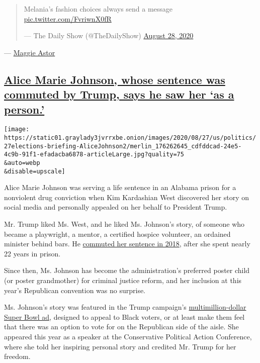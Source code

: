 \begin{quote}
Melania's fashion choices always send a message
\href{https://t.co/FvriwnX0fR}{pic.twitter.com/FvriwnX0fR}

--- The Daily Show (@TheDailyShow)
\href{https://twitter.com/TheDailyShow/status/1299177915028996096?ref_src=twsrc\%5Etfw}{August
28, 2020}
\end{quote}

--- \href{https://www.nytimes3xbfgragh.onion/by/maggie-astor}{Maggie
Astor}

\hypertarget{alice-marie-johnson-whose-sentence-was-commuted-by-trump-says-he-saw-her-as-a-person}{%
\subsection{\texorpdfstring{\protect\hyperlink{alice-marie-johnson-whose-sentence-was-commuted-by-trump-says-he-saw-her-as-a-person}{Alice
Marie Johnson, whose sentence was commuted by Trump, says he saw her `as
a
person.'}}{Alice Marie Johnson, whose sentence was commuted by Trump, says he saw her `as a person.'}}\label{alice-marie-johnson-whose-sentence-was-commuted-by-trump-says-he-saw-her-as-a-person}}

\texttt{[image: https://static01.graylady3jvrrxbe.onion/images/2020/08/27/us/politics/27elections-briefing-AliceJohnson2/merlin\_176262645\_cdfddcad-24e5-4c9b-91f1-efadacba6878-articleLarge.jpg?quality=75\\\&auto=webp\\\&disable=upscale]}

Alice Marie Johnson was serving a life sentence in an Alabama prison for
a nonviolent drug conviction when Kim Kardashian West discovered her
story on social media and personally appealed on her behalf to President
Trump.

Mr. Trump liked Ms. West, and he liked Ms. Johnson's story, of someone
who became a playwright, a mentor, a certified hospice volunteer, an
ordained minister behind bars. He
\href{https://www.nytimes3xbfgragh.onion/2018/06/06/us/politics/trump-alice-johnson-sentence-commuted-kim-kardashian-west.html}{commuted
her sentence in 2018}, after she spent nearly 22 years in prison.

Since then, Ms. Johnson has become the administration's preferred poster
child (or poster grandmother) for criminal justice reform, and her
inclusion at this year's Republican convention was no surprise.

Ms. Johnson's story was featured in the Trump campaign's
\href{https://www.nytimes3xbfgragh.onion/2020/02/04/us/politics/trump-super-bowl-ad.html}{multimillion-dollar
Super Bowl ad}, designed to appeal to Black voters, or at least make
them feel that there was an option to vote for on the Republican side of
the aisle. She appeared this year as a speaker at the Conservative
Political Action Conference, where she told her inspiring personal story
and credited Mr. Trump for her freedom.


